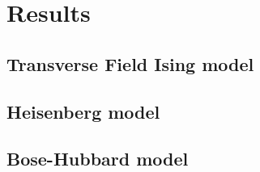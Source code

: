 
\chapter{Results}
\label{chapter5}

\ifpdf
\graphicspath{{Chapter5/Figs/Raster/}{Chapter5/Figs/PDF/}{Chapter5/Figs/}}
\else
\graphicspath{{Chapter5/Figs/Vector/}{Chapter5/Figs/}}
\fi

\section{Transverse Field Ising model}
\label{sec:res-im}

\section{Heisenberg model}
\label{sec:res-hm}

\section{Bose-Hubbard model}
\label{sec:res-bhm}

